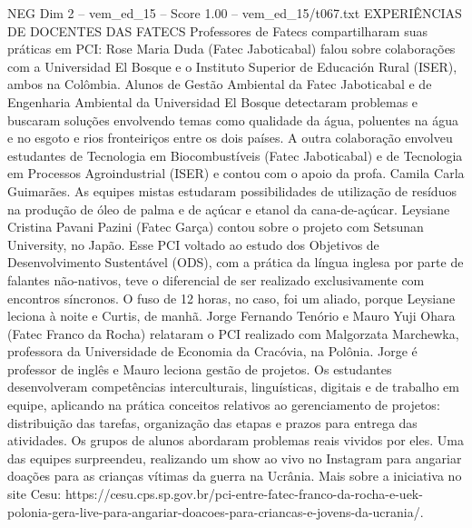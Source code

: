 \begin{textsample}{NEG Dim 2 – vem\_ed\_15 – Score 1.00 – vem\_ed\_15/t067.txt}  \label{ex:f2_neg_029}
EXPERIÊNCIAS DE DOCENTES DAS FATECS Professores de Fatecs compartilharam suas práticas em PCI: Rose Maria Duda (Fatec Jaboticabal) falou sobre colaborações com a Universidad El Bosque e o Instituto Superior de Educación Rural (ISER), ambos na Colômbia.
Alunos de Gestão Ambiental da Fatec Jaboticabal e de Engenharia Ambiental da Universidad El Bosque detectaram problemas e buscaram soluções envolvendo temas como qualidade da água, poluentes na água e no esgoto e rios fronteiriços entre os dois países.
A outra colaboração envolveu estudantes de Tecnologia em Biocombustíveis (Fatec Jaboticabal) e de Tecnologia em Processos Agroindustrial (ISER) e contou com o apoio da profa.
Camila Carla Guimarães.
As equipes mistas estudaram possibilidades de utilização de resíduos na produção de óleo de palma e de açúcar e etanol da cana-de-açúcar.
Leysiane Cristina Pavani Pazini (Fatec Garça) contou sobre o projeto com Setsunan University, no Japão.
Esse PCI voltado ao estudo dos Objetivos de Desenvolvimento Sustentável (ODS), com a prática da língua inglesa por parte de falantes não-nativos, teve o diferencial de ser realizado exclusivamente com encontros síncronos.
O fuso de 12 horas, no caso, foi um aliado, porque Leysiane leciona à noite e Curtis, de manhã.
Jorge Fernando Tenório e Mauro Yuji Ohara (Fatec Franco da Rocha) relataram o PCI realizado com Malgorzata Marchewka, professora da Universidade de Economia da Cracóvia, na Polônia.
Jorge é professor de inglês e Mauro leciona gestão de projetos.
Os estudantes desenvolveram competências interculturais, linguísticas, digitais e de trabalho em equipe, aplicando na prática conceitos relativos ao gerenciamento de projetos: distribuição das tarefas, organização das etapas e prazos para entrega das atividades.
Os grupos de alunos abordaram problemas reais vividos por eles.
Uma das equipes surpreendeu, realizando um show ao vivo no Instagram para angariar doações para as crianças vítimas da guerra na Ucrânia.
Mais sobre a iniciativa no site Cesu: https://cesu.cps.sp.gov.br/pci-entre-fatec-franco-da-rocha-e-uek-polonia-gera-live-para-angariar-doacoes-para-criancas-e-jovens-da-ucrania/.

\end{textsample}
